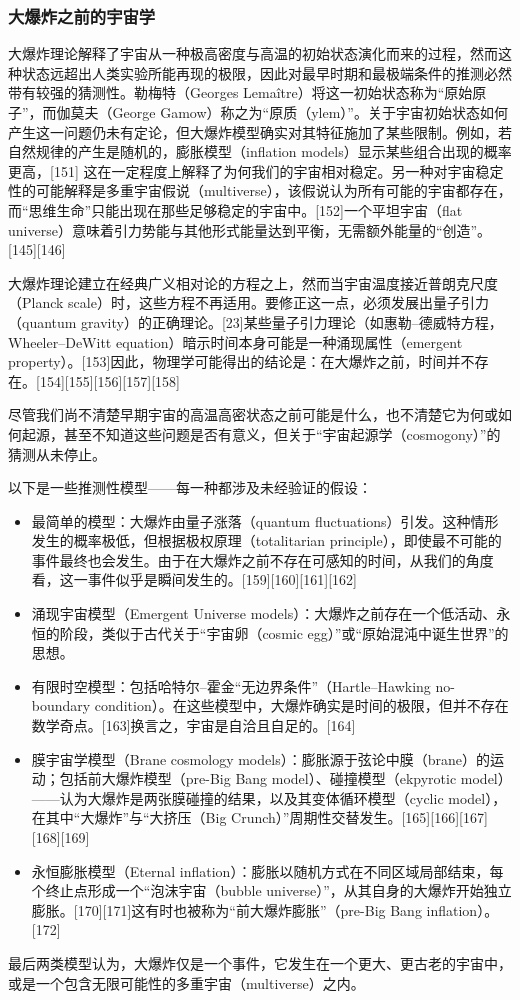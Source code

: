 \subsubsection{大爆炸之前的宇宙学}
大爆炸理论解释了宇宙从一种极高密度与高温的初始状态演化而来的过程，然而这种状态远超出人类实验所能再现的极限，因此对最早时期和最极端条件的推测必然带有较强的猜测性。勒梅特（Georges Lemaître）将这一初始状态称为“原始原子”，而伽莫夫（George Gamow）称之为“原质（ylem）”。关于宇宙初始状态如何产生这一问题仍未有定论，但大爆炸模型确实对其特征施加了某些限制。例如，若自然规律的产生是随机的，膨胀模型（inflation models）显示某些组合出现的概率更高，[151]  
这在一定程度上解释了为何我们的宇宙相对稳定。另一种对宇宙稳定性的可能解释是多重宇宙假说（multiverse），该假说认为所有可能的宇宙都存在，而“思维生命”只能出现在那些足够稳定的宇宙中。[152]一个平坦宇宙（flat universe）意味着引力势能与其他形式能量达到平衡，无需额外能量的“创造”。[145][146]

大爆炸理论建立在经典广义相对论的方程之上，然而当宇宙温度接近普朗克尺度（Planck scale）时，这些方程不再适用。要修正这一点，必须发展出量子引力（quantum gravity）的正确理论。[23]某些量子引力理论（如惠勒–德威特方程，Wheeler–DeWitt equation）暗示时间本身可能是一种涌现属性（emergent property）。[153]因此，物理学可能得出的结论是：在大爆炸之前，时间并不存在。[154][155][156][157][158]

尽管我们尚不清楚早期宇宙的高温高密状态之前可能是什么，也不清楚它为何或如何起源，甚至不知道这些问题是否有意义，但关于“宇宙起源学（cosmogony）”的猜测从未停止。

以下是一些推测性模型——每一种都涉及未经验证的假设：
\begin{itemize}
\item 最简单的模型：大爆炸由量子涨落（quantum fluctuations）引发。这种情形发生的概率极低，但根据极权原理（totalitarian principle），即使最不可能的事件最终也会发生。由于在大爆炸之前不存在可感知的时间，从我们的角度看，这一事件似乎是瞬间发生的。[159][160][161][162]
\item 涌现宇宙模型（Emergent Universe models）：大爆炸之前存在一个低活动、永恒的阶段，类似于古代关于“宇宙卵（cosmic egg）”或“原始混沌中诞生世界”的思想。
\item 有限时空模型：包括哈特尔–霍金“无边界条件”（Hartle–Hawking no-boundary condition）。在这些模型中，大爆炸确实是时间的极限，但并不存在数学奇点。[163]换言之，宇宙是自洽且自足的。[164]
\item 膜宇宙学模型（Brane cosmology models）：膨胀源于弦论中膜（brane）的运动；包括前大爆炸模型（pre-Big Bang model）、碰撞模型（ekpyrotic model）——认为大爆炸是两张膜碰撞的结果，以及其变体循环模型（cyclic model），在其中“大爆炸”与“大挤压（Big Crunch）”周期性交替发生。[165][166][167][168][169]
\item 永恒膨胀模型（Eternal inflation）：膨胀以随机方式在不同区域局部结束，每个终止点形成一个“泡沫宇宙（bubble universe）”，从其自身的大爆炸开始独立膨胀。[170][171]这有时也被称为“前大爆炸膨胀”（pre-Big Bang inflation）。[172]
\end{itemize}
最后两类模型认为，大爆炸仅是一个事件，它发生在一个更大、更古老的宇宙中，或是一个包含无限可能性的多重宇宙（multiverse）之内。
